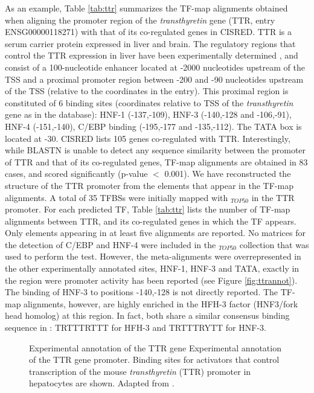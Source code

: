 As an example, Table \ref{tab:ttr} summarizes the TF-map alignments
obtained when aligning the promoter region of the \emph{transthyretin}
gene (TTR, \ensembl{} entry ENSG00000118271) with that of its
co-regulated genes in CISRED. TTR is a serum carrier protein expressed
in liver and brain. The regulatory regions that control the TTR
expression in liver have been experimentally determined \citep{costa:1989a}, 
and consist of a 100-nucleotide enhancer located at -2000 nucleotides 
upstream of the TSS and
a proximal promoter region between -200 and -90 nucleotides upstream of the TSS
(relative to the coordinates in the \ensembl{} entry).
This proximal region is constituted of 6 binding
sites (coordinates relative to TSS of the \emph{transthyretin} 
gene as in the \ensembl{} database): HNF-1 (-137,-109),
HNF-3 (-140,-128 and -106,-91), HNF-4 (-151,-140), C/EBP binding
(-195,-177 and -135,-112). The TATA box is located at -30.
CISRED lists 105 genes co-regulated with TTR. Interestingly, while
BLASTN is unable to detect any sequence 
similarity between the promoter of TTR and that of its co-regulated
genes,  TF-map alignments are obtained in 83
cases, and scored significantly (p-value $<$ 0.001). We have 
reconstructed the structure of the TTR promoter from
the elements that appear in the TF-map alignments. 
A total of 35 TFBSs were initially mapped with $_{TOP50}$ in the 
TTR promoter. For each predicted TF, Table \ref{tab:ttr} lists the number of 
TF-map alignments between TTR, and its co-regulated genes in which the TF appears. 
Only elements appearing in at least five alignments are reported. No matrices 
for the detection of C/EBP and HNF-4 were included in the $_{TOP50}$ collection 
that was used to perform the test. However, the meta-alignments were 
overrepresented in the other experimentally annotated sites, HNF-1, HNF-3 and TATA,
exactly in the region were promoter activity has been reported
(see Figure \ref{fig:ttrannot}). The binding of HNF-3 to positions -140,-128 
is not directly reported. The
TF-map alignments, however, are highly enriched in the HFH-3 factor 
(HNF3/fork head homolog) at this region. In fact, both share a similar 
consensus binding sequence in  \citep{matys:2003a}: TRTTTRTTT for 
HFH-3 and TRTTTRYTT for HNF-3. 

\begin{figure}[t!]
\begin{center}
\setlength{\fboxsep}{0pt}
          {Experimental annotation of the TTR gene}%
          {Experimental annotation of the TTR gene promoter.}%
          {Binding sites for activators that control transcription of the mouse 
           \emph{transthyretin} (TTR) promoter in hepatocytes are shown. Adapted from \citep{lodish:2000a}.}
\end{center}
\end{figure}

